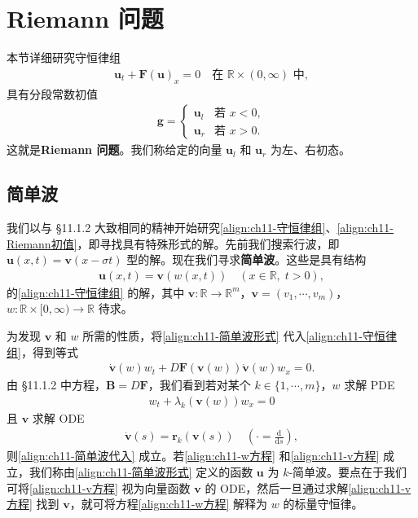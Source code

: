 \documentclass[../../main.tex]{subfiles}
\begin{document}
\section{Riemann 问题}\label{section:ch11-Riemann问题}

本节详细研究守恒律组
\begin{align}
\mathbf{u}_t+\mathbf{F}(\mathbf{u})_x=0 \quad \text{在 } \mathbb{R}\times(0,\infty) \text{ 中},
\label{align:ch11-守恒律组}
\end{align}
具有分段常数初值
\begin{align}
\mathbf{g}=
\begin{cases}
\mathbf{u}_l & \text{若 } x<0,\\
\mathbf{u}_r & \text{若 } x>0.
\end{cases}
\label{align:ch11-Riemann初值}
\end{align}
这就是\textbf{Riemann 问题}。我们称给定的向量 $\mathbf{u}_l$ 和 $\mathbf{u}_r$ 为左、右初态。

\subsection{简单波}\label{subsection:ch11-简单波}

我们以与 \S11.1.2 大致相同的精神开始研究\eqref{align:ch11-守恒律组}、\eqref{align:ch11-Riemann初值}，即寻找具有特殊形式的解。先前我们搜索行波，即 $\mathbf{u}(x,t)=\mathbf{v}(x-\sigma t)$ 型的解。现在我们寻求\textbf{简单波}。这些是具有结构
\begin{align}
\mathbf{u}(x,t)=\mathbf{v}(w(x,t)) \quad (x\in\mathbb{R},\;t>0),
\label{align:ch11-简单波形式}
\end{align}
的\eqref{align:ch11-守恒律组} 的解，其中 $\mathbf{v}:\mathbb{R}\to\mathbb{R}^m$，$\mathbf{v}=(v_1,\cdots,v_m)$，$w:\mathbb{R}\times[0,\infty)\to\mathbb{R}$ 待求。

为发现 $\mathbf{v}$ 和 $w$ 所需的性质，将\eqref{align:ch11-简单波形式} 代入\eqref{align:ch11-守恒律组}，得到等式
\begin{align}
\dot{\mathbf{v}}(w)w_t+D\mathbf{F}(\mathbf{v}(w))\dot{\mathbf{v}}(w)w_x=0.
\label{align:ch11-简单波代入}
\end{align}
由 \S11.1.2 中方程，$\mathbf{B}=D\mathbf{F}$，我们看到若对某个 $k\in\{1,\cdots,m\}$，$w$ 求解 PDE
\begin{align}
w_t+\lambda_k(\mathbf{v}(w))w_x=0
\label{align:ch11-w方程}
\end{align}
且 $\mathbf{v}$ 求解 ODE
\begin{align}
\dot{\mathbf{v}}(s)=\mathbf{r}_k(\mathbf{v}(s)) \quad (\cdot=\tfrac{\mathrm{d}}{\mathrm{d}s}),
\label{align:ch11-v方程}
\end{align}
则\eqref{align:ch11-简单波代入} 成立。若\eqref{align:ch11-w方程} 和\eqref{align:ch11-v方程} 成立，我们称由\eqref{align:ch11-简单波形式} 定义的函数 $\mathbf{u}$ 为 $k$-简单波。要点在于我们可将\eqref{align:ch11-v方程} 视为向量函数 $\mathbf{v}$ 的 ODE，然后一旦通过求解\eqref{align:ch11-v方程} 找到 $\mathbf{v}$，就可将方程\eqref{align:ch11-w方程} 解释为 $w$ 的标量守恒律。
\end{document}
